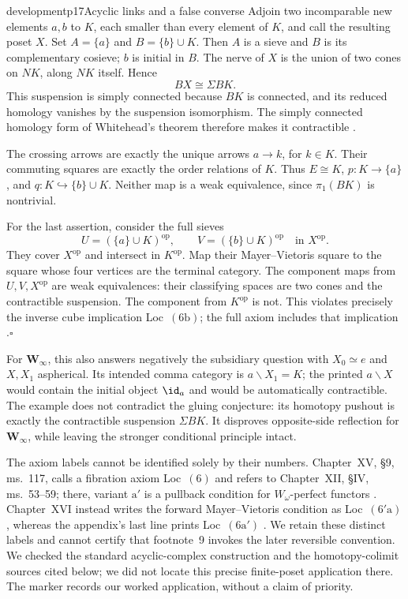 \begin{dcomment}{development}{p17}{Acyclic links and a false converse}
Adjoin two incomparable new elements $a,b$ to $K$, each smaller than every element of $K$, and call the resulting poset $X$. Set $A=\{a\}$ and $B=\{b\}\cup K$. Then $A$ is a sieve and $B$ is its complementary cosieve; $b$ is initial in $B$. The nerve of $X$ is the union of two cones on $NK$, along $NK$ itself. Hence
\[
 BX\cong\Sigma BK.
\]
This suspension is simply connected because $BK$ is connected, and its reduced homology vanishes by the suspension isomorphism. The simply connected homology form of Whitehead's theorem therefore makes it contractible \citep[Corollary~4.33]{Hatcher2002}.

The crossing arrows are exactly the unique arrows $a\to k$, for $k\in K$. Their commuting squares are exactly the order relations of $K$. Thus $E\cong K$, $p:K\to\{a\}$, and $q:K\hookrightarrow\{b\}\cup K$. Neither map is a weak equivalence, since $\pi_1(BK)$ is nontrivial.

For the last assertion, consider the full sieves
\[
 U=(\{a\}\cup K)^{\mathrm{op}},\qquad
 V=(\{b\}\cup K)^{\mathrm{op}}
 \quad\text{in }X^{\mathrm{op}}.
\]
They cover $X^{\mathrm{op}}$ and intersect in $K^{\mathrm{op}}$. Map their Mayer--Vietoris square to the square whose four vertices are the terminal category. The component maps from $U,V,X^{\mathrm{op}}$ are weak equivalences: their classifying spaces are two cones and the contractible suspension. The component from $K^{\mathrm{op}}$ is not. This violates precisely the inverse cube implication Loc~$(6\mathrm b)$; the full axiom includes that implication \citep[\S3, ms.~$16'$--$17'$, footnote~13]{GrothendieckDerivateursXVI}.\hfill$\square$

For $\mathbf W_\infty$, this also answers negatively the subsidiary question with $X_0\simeq e$ and $X,X_1$ aspherical. Its intended comma category is $a\backslash X_1=K$; the printed $a\backslash X$ would contain the initial object $\id_a$ and would be automatically contractible. The example does not contradict the gluing conjecture: its homotopy pushout is exactly the contractible suspension $\Sigma BK$. It disproves opposite-side reflection for $\mathbf W_\infty$, while leaving the stronger conditional principle intact.

The axiom labels cannot be identified solely by their numbers. Chapter~XV, \S9, ms.~117, calls a fibration axiom Loc~$(6)$ \citep{Grothendieck1990XV} and refers to Chapter~XII, \S IV, ms.~53--59; there, variant $\mathrm a'$ is a pullback condition for $W_\omega$-perfect functors \citep{Grothendieck1990XIIa}. Chapter~XVI instead writes the forward Mayer--Vietoris condition as Loc~$(6'\mathrm a)$, whereas the appendix's last line prints Loc~$(6\mathrm a')$ \citep[\S3, ms.~$17'$]{GrothendieckDerivateursXVI}. We retain these distinct labels and cannot certify that footnote~9 invokes the later reversible convention. We checked the standard acyclic-complex construction and the homotopy-colimit sources cited below; we did not locate this precise finite-poset application there. The marker records our worked application, without a claim of priority.
\end{dcomment}


